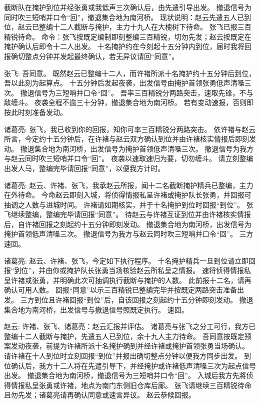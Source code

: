 \begin{zhblock}
{截断队在掩护到位并经张勇或我低声三次确认后，由先遣引导出发。
撤退信号为同时吹三短哨并口令“回”，撤退集合地为南河桥。
现状说明：赵云先遣五人已到位，赵云已整编十二人截断与掩护，主力十九人在大槐树下待命。
张飞已报三百精锐待命。
命令：张飞按既定编制即刻整编三百精锐，切勿先发；赵云按既定在掩护确认后即令十二人出发。
十名掩护约在今刻起十五分钟内到位，届时我将回报确切整点分钟并发起最终确认，若无异议请回“同意”。
\par 张飞:
吾同意。
既然赵云已整编十二人，而许褚所派十名掩护约十五分钟后到位，吾以此刻为起算点。
十五分钟后发起夜袭，出发信号由掩护首领张勇低声清嗓三次。
撤退信号为三短哨并口令“回”。
吾率三百精锐分两路突击，速取先锋，不与敌缠斗。
夜袭全程不逾三十分钟，撤退集合地为南河桥。
若有变动速报，否则即按此时刻准备发动。
\par 诸葛亮:
张飞，我已收到你的回报，知你可率三百精锐分两路突击。
依许褚与赵云所言，今定约十五分钟后，在许褚与赵云双方确认到位并由许褚核实情报后即刻发动。
撤退集合地为南河桥，出发信号为掩护首领低声清嗓三次。
撤退信号为我方与赵云同时吹三短哨并口令“回”。
夜袭以速取速归为要，切勿缠斗。
请立刻整编出发人马，整编完毕请回报“同意”，以便我方计时。
\par 诸葛亮:
赵云、许褚、张飞，我承赵云所报，闻十二名截断掩护精兵已整编，主力在外待命。
今命赵云即刻入城，将侦得情报私呈许褚或掩护队长张勇，并回报可抽调之人数与进城时间。
许褚请如期核实，并于十名掩护到位时回报“到位”。
张飞继续整编，整编完毕请回报“同意”。
待赵云与许褚互证到位并由许褚核实情报后，自许褚回报之刻起约十五分钟即刻发动。
撤退集合地为南河桥，出发信号为掩护首领低声清嗓三次。
撤退信号为我方与赵云同时吹三短哨并口令“回”。
三方速回。
\par 诸葛亮:
赵云、许褚、张飞，今定如下执行程序。
十名掩护精兵一旦到位请立即回报“到位”，并由你或掩护队长张勇当场核验赵云所私呈之情报。
速将侦得情报私呈许褚或张勇，并明确此次可抽调执行截断与掩护的人数。
此前报十二名，请再确认可用人数。
回报“同意”以示三百精锐已整编完毕并按既定两路突击准备出发。
三方到位且许褚回报“到位”后，自该回报之刻起约十五分钟即刻发动。
撤退集合地为南河桥，出发信号与撤退信号照既定执行。
速回。
\par 赵云:
许褚、张飞、诸葛亮：赵云汇报并评估。
诸葛亮与张飞之分工可行，我方已整编十二人截断与掩护，先遣五人已到位，余十九人主力待命。
吾同意按既定预案发动夜袭，前提为许褚所派十名掩护确到并经许褚或掩护首领张勇当场确认。
请许褚在十人到位时立刻回报“到位”并报出确切整点分钟以便我方同步出发。
到位确认后，我方十二人将在先遣引导下，并经掩护或许褚低声清嗓三次为起点信号出发。
撤退集合地为南河桥，撤退信号为三短哨并口令“回”。
入城后我方先將侦得情报私呈张勇或许褚，地点为南门东侧旧仓库后廊。
张飞请继续三百精锐待命且勿先发；诸葛亮请再确认同意或速言异议。
赵云恭候回报。}
\end{zhblock}
